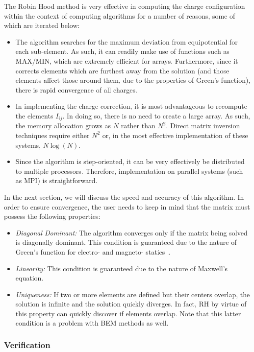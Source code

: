 The Robin Hood method is very effective in computing the charge configuration within the context of computing algorithms for a number of reasons, some of which are iterated below:

\begin{itemize}
\item The algorithm searches for the maximum deviation from equipotential for each sub-element.  As such, it can readily make use of functions such as MAX/MIN, which are extremely efficient for arrays.  Furthermore, since it corrects elements which are furthest away from the solution (and those elements affect those around them, due to the properties of Green's function), there is rapid convergence of all charges.
\item In implementing the charge correction, it is most advantageous to recompute the elements $I_{ij}$.  In doing so, there is no need to create a large array.  As such, the memory allocation grows as $N$ rather than $N^2$.  Direct matrix inversion techniques require either $N^2$ or, in the most effective implementation of these systems, $N \log{(N)}$.
\item Since the algorithm is step-oriented, it can be very effectively be distributed to multiple processors.  Therefore, implementation on parallel systems (such as MPI) is straightforward.
\end{itemize}

In the next section, we will discuss the speed and accuracy of this algorithm.  In order to ensure convergence, the user needs to keep in mind that the matrix must possess the following properties:

\begin{itemize}
\item  {\it Diagonal Dominant:}  The algorithm converges only if the matrix being solved is diagonally dominant.  This condition is guaranteed due to the nature of Green's function for electro- and magneto- statics~\cite{Gluck}.
\item  {\it Linearity:}  This condition is guaranteed due to the nature of Maxwell's equation.
\item  {\it Uniqueness:}  If two or more elements are defined but their centers overlap, the solution is infinite and the solution quickly diverges.  In fact, RH by virtue of this property can quickly discover if elements overlap.  Note that this latter condition is a problem with BEM methods as well.
\end{itemize}

\subsubsection{Verification}

